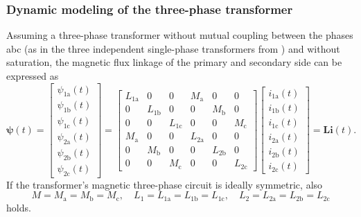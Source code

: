 \begin{frame}
	\frametitle{Dynamic modeling of the three-phase transformer}
	Assuming a three-phase transformer without mutual coupling between the phases abc (as in the three independent single-phase transformers from ) and without saturation, the magnetic flux linkage of the primary and secondary side can be expressed as
		\begin{equation}
			\bm{\psi}(t) = \begin{bmatrix} \psi_{1\mathrm{a}}(t) \\ \psi_{1\mathrm{b}}(t) \\ \psi_{1\mathrm{c}}(t) \\ \psi_{2\mathrm{a}}(t) \\ \psi_{2\mathrm{b}}(t) \\ \psi_{2\mathrm{c}}(t)\end{bmatrix} = \begin{bmatrix} L_{1\mathrm{a}} & 0 & 0 & M_{\mathrm{a}} & 0 & 0 \\ 0 & L_{1\mathrm{b}} & 0 & 0 & M_{\mathrm{b}} & 0 \\ 0 & 0 & L_{1\mathrm{c}} & 0 & 0 &M_{\mathrm{c}} \\ M_{\mathrm{a}} & 0 & 0 & L_{2\mathrm{a}} & 0 &0 \\ 0 & M_{\mathrm{b}} & 0 & 0 & L_{2\mathrm{b}} & 0 \\ 0 & 0 & M_{\mathrm{c}} & 0 & 0 &L_{2\mathrm{c}}\end{bmatrix} \begin{bmatrix} i_{1\mathrm{a}}(t) \\ i_{1\mathrm{b}}(t) \\ i_{1\mathrm{c}}(t) \\ i_{2\mathrm{a}}(t) \\ i_{2\mathrm{b}}(t) \\ i_{2\mathrm{c}}(t)\end{bmatrix} = \bm{L}\bm{i}(t).
		\end{equation}
		\pause
		If the transformer's magnetic three-phase circuit is ideally symmetric, also
		$$ M = M_{\mathrm{a}} = M_{\mathrm{b}} = M_{\mathrm{c}}, \quad L_1 = L_{1\mathrm{a}} = L_{1\mathrm{b}} = L_{1\mathrm{c}}, \quad L_2 = L_{2\mathrm{a}} = L_{2\mathrm{b}} = L_{2\mathrm{c}}$$
		holds. 
\end{frame}

